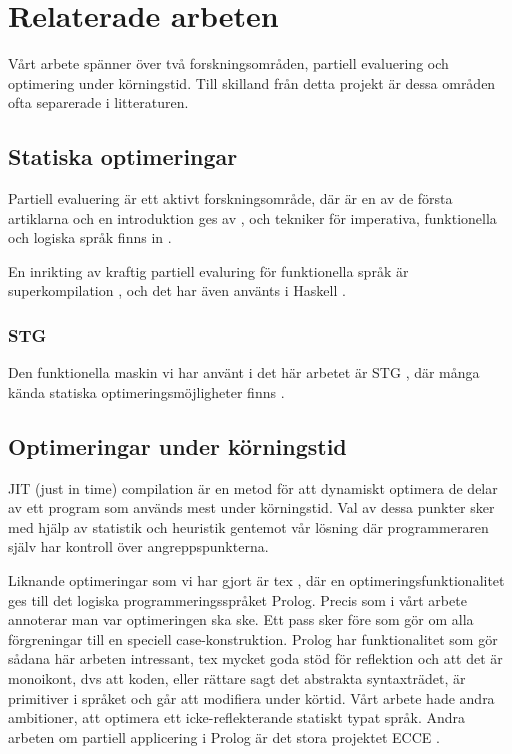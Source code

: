 \documentclass[Rapport]{subfiles}
\begin{document}
\section{Relaterade arbeten}

Vårt arbete spänner över två forskningsområden, partiell evaluering
och optimering under körningstid. Till skilland från detta projekt 
är dessa områden ofta separerade i litteraturen.

\subsection{Statiska optimeringar}

Partiell evaluering är ett aktivt forskningsområde, där 
\cite{futamura} är en av de första artiklarna
och en introduktion ges av \cite{intropap}, och
tekniker för imperativa, funktionella och logiska språk
finns in \cite{jones1993partial}.

En inrikting av kraftig partiell evaluring för 
funktionella språk är superkompilation \cite{srensen1995algorithm}
, och det har även använts i Haskell \cite{mitchell2007supercompiler}.


\subsubsection{STG}

Den funktionella maskin vi har använt i det här arbetet är 
STG \cite{stg}, där många kända statiska optimeringsmöjligheter 
finns \cite{santos}.

\subsection{Optimeringar under körningstid}

JIT (just in time) compilation är en metod för att dynamiskt optimera
de delar av ett program som används mest under körningstid. Val av
dessa punkter sker med hjälp av statistik och heuristik gentemot vår
lösning där programmeraren själv har kontroll över angreppspunkterna. 

Liknande optimeringar som vi har gjort är tex \cite{bolz-automatic},
där en optimeringsfunktionalitet ges till det logiska programmeringsspråket
Prolog. Precis som i vårt arbete annoterar man var optimeringen ska ske.
Ett pass sker före som gör om alla förgreningar till en speciell 
case-konstruktion. Prolog har funktionalitet som gör sådana här arbeten
intressant, tex mycket goda stöd för reflektion och att det är 
monoikont, dvs att koden, eller rättare sagt det abstrakta syntaxträdet,
är primitiver i språket och går att modifiera under körtid. Vårt arbete
hade andra ambitioner, att optimera ett icke-reflekterande statiskt typat
språk. Andra arbeten om partiell applicering i Prolog är det stora
projektet ECCE \cite{ecce}.
\end{document}
